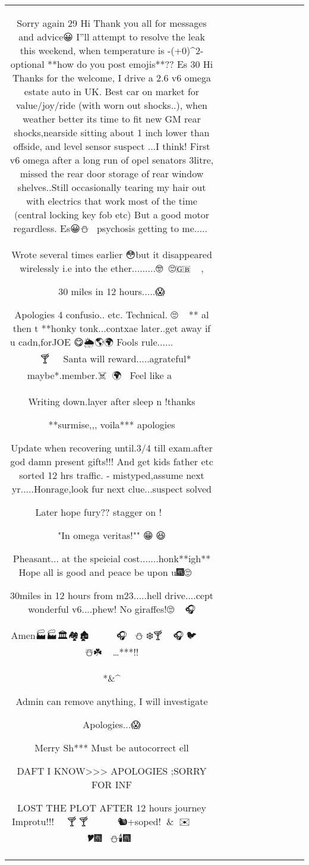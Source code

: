 \begin{table}[h!]
\begin{tabular}{|c|c|c|c|c|c|c|c|c|c|}
{Sorry again 
29
Hi
Thank you all for messages and advice😀
I''ll attempt to resolve the leak this weekend, when temperature is -(+0)^2- optional
**how do you post emojis**??
Es
30
Hi
Thanks for the welcome, I drive a 2.6 v6 omega estate auto in UK. Best car on market for value/joy/ride (with worn out shocks..), when weather better its time to fit new GM rear shocks,nearside sitting about 1 inch lower than offside, and level sensor suspect ...I think!
First v6 omega after a long run of opel senators 3litre, missed the rear door storage of rear window shelves..Still occasionally tearing my hair out with electrics that work most of the time (central locking key fob etc) But a good motor regardless.
Es😀⛄️🎄🎅🤠psychosis getting to me.....🦆

Wrote several times earlier 😳but it disappeared wirelessly i.e into the ether.........🤓🤤🤤🙄🇬🇧😋😸😺🦑, 

30 miles in 12 hours.....😱

Apologies 4 confusio.. etc. Technical. 🙄🎄🎄😀🐼** al then t **honky tonk...contxae later..get away if u cadn,forJOE 😋🌦🌎🌍 Fools rule......🐼🐵🐵😁
🐺🐺🐺😇🌋🤐🎄🎃🎄🎉🎆🎆🥂🍸🍴🍹🍺🍻
Santa will reward.....agrateful* maybe*.member.☠️🤪🍻🌍🐋🏴
Feel like a 🤡🤐🙄🤧🤔😁🤓💀

Writing down.layer after sleep n !thanks

**surmise,,, voila*** apologies

Update when recovering until.3/4 till exam.after god damn present gifts!!! And get kids father etc sorted 12 hrs traffic. - mistyped,assume next yr.....Honrage,look fur next clue...suspect solved

Later hope fury?? stagger on !🐼🐼🐼🐼🐼🐼🐲🐤🎄🎃



"In omega veritas!""        😁🐼😆

Pheasant... at the speieial cost.......honk**igh**   Hope all is good and peace be upon u🎆🙄🎃🎄🐥🎺🍹


30miles in 12 hours from m23.....hell drive....cept wonderful v6....phew! No giraffes!🙄🐸🐸🎤😜🎧

Amen🏭🏭🏛🏘🏚🐼🦆🍰🐓🍾🍴🍰🎂🍺🎷🎧🎄🎄🎄⛄️🎄❄️🍸🥃🎩😇😁🎧🐺🐦🌋😺🐱😺🐼🐯☃️☘️🤭🌲🐅😇…***!!

*\&^%

Admin can remove anything, I will investigate

Apologies...😱

Merry Sh*** Must be autocorrect ell

DAFT I KNOW>>> APOLOGIES ;SORRY FOR INF

LOST THE PLOT AFTER 12 hours journey Improtu!!!🤤🤗💀🐒🍷🍸😎🍸🍻😑🤠🎄🎃🐼🐼🐼🐜🐝🐝🐿️+soped!🤕🤬\&🍹🐼✉️🎺🌷🎇🎆🏴🐔🐔🐝🎔🎆🎄🎅🍻⛄️🕯️🎆🎃🍾

}
\end{tabular}
\end{table}
